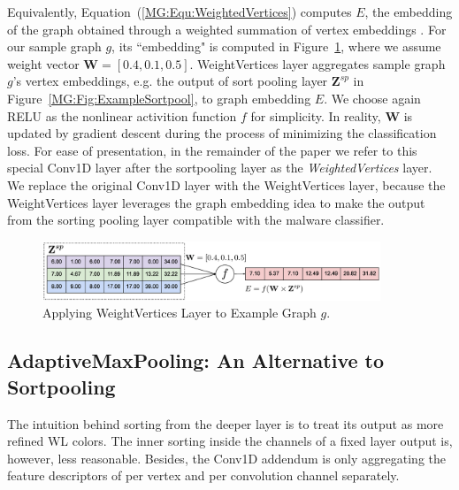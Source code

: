 Equivalently, Equation~(\ref{MG:Equ:WeightedVertices}) computes $E$, the embedding of the graph obtained through a weighted summation of vertex embeddings \cite{GraphEmbedding}.
For our sample graph $g$, its ``embedding" is computed in Figure~\ref{MG:Fig:ExampleWeightedVertice}, where we assume weight vector $\mathbf{W}=[0.4, 0.1, 0.5]$.
WeightVertices layer aggregates sample graph $g$'s vertex embeddings,
e.g. the output of sort pooling layer $\mathbf{Z}^{sp}$ in Figure~\ref{MG:Fig:ExampleSortpool}, to graph embedding $E$.
We choose again RELU as the nonlinear activition function $f$ for simplicity.
In reality, $\mathbf{W}$ is updated by gradient descent during the process of minimizing the classification loss.
For ease of presentation, in the remainder of the paper we refer to this special Conv1D layer after the sortpooling layer as the \textit{WeightedVertices} layer.
We replace the original Conv1D layer with the WeightVertices layer, because the WeightVertices layer leverages the graph embedding idea to make the output from the sorting pooling layer compatible with the malware classifier.

\begin{figure}[htbp]
    \centerline{\includegraphics[width=0.90\textwidth]{Magic/figures/ExampleWeightedVertice.eps}}
    \caption{Applying WeightVertices Layer to Example Graph $g$.}
    \label{MG:Fig:ExampleWeightedVertice}
\end{figure}

\subsection{AdaptiveMaxPooling: An Alternative to Sortpooling}
The intuition behind sorting from the deeper layer is to treat its output as more refined WL colors\cite{WlAlgorithm, WlGraphKernel}.
The inner sorting inside the channels of a fixed layer output is, however, less reasonable.
Besides, the Conv1D addendum is only aggregating the feature descriptors of per vertex and per convolution channel separately.

